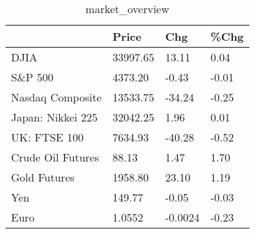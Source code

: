 \documentclass{article}%
\begin{document}
%


\begin{table}[htbp]%
\caption{market\_overview}%
\centering%
\begin{adjustbox}{width=1\textwidth}%
\begin{tabular}{llll}
\toprule
                  &    Price &     Chg &  \%Chg \\
\midrule
             DJIA & 33997.65 &   13.11 &  0.04 \\
          S\&P 500 &  4373.20 &   -0.43 & -0.01 \\
 Nasdaq Composite & 13533.75 &  -34.24 & -0.25 \\
Japan: Nikkei 225 & 32042.25 &    1.96 &  0.01 \\
     UK: FTSE 100 &  7634.93 &  -40.28 & -0.52 \\
Crude Oil Futures &    88.13 &    1.47 &  1.70 \\
     Gold Futures &  1958.80 &   23.10 &  1.19 \\
              Yen &   149.77 &   -0.05 & -0.03 \\
             Euro &   1.0552 & -0.0024 & -0.23 \\
\bottomrule
\end{tabular}
%
\end{adjustbox}%
\end{table}

%
\end{document}
